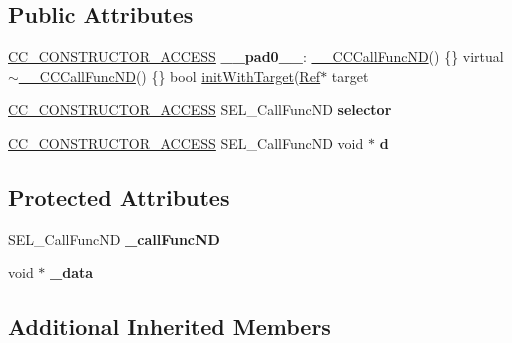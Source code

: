 \subsection*{Public Attributes}
\begin{DoxyCompactItemize}
\item 
\mbox{\label{class____CCCallFuncND_a8e47248aa40718ef17f10165dc3d3a32}} 
\hyperlink{_2cocos2d_2cocos_2base_2ccConfig_8h_a25ef1314f97c35a2ed3d029b0ead6da0}{C\+C\+\_\+\+C\+O\+N\+S\+T\+R\+U\+C\+T\+O\+R\+\_\+\+A\+C\+C\+E\+SS} {\bfseries \+\_\+\+\_\+pad0\+\_\+\+\_\+}\+: \hyperlink{class____CCCallFuncND}{\+\_\+\+\_\+\+C\+C\+Call\+Func\+ND}() \{\} virtual $\sim$\hyperlink{class____CCCallFuncND}{\+\_\+\+\_\+\+C\+C\+Call\+Func\+ND}() \{\} bool \hyperlink{classCallFunc_a68a7834d7931d5439faf49ca6e955dd7}{init\+With\+Target}(\hyperlink{classRef}{Ref}$\ast$ target
\item 
\mbox{\label{class____CCCallFuncND_aeb2b7369b7596436ea9c92668ae2d653}} 
\hyperlink{_2cocos2d_2cocos_2base_2ccConfig_8h_a25ef1314f97c35a2ed3d029b0ead6da0}{C\+C\+\_\+\+C\+O\+N\+S\+T\+R\+U\+C\+T\+O\+R\+\_\+\+A\+C\+C\+E\+SS} S\+E\+L\+\_\+\+Call\+Func\+ND {\bfseries selector}
\item 
\mbox{\label{class____CCCallFuncND_af8022787c42afb712edf7ad6d6111f33}} 
\hyperlink{_2cocos2d_2cocos_2base_2ccConfig_8h_a25ef1314f97c35a2ed3d029b0ead6da0}{C\+C\+\_\+\+C\+O\+N\+S\+T\+R\+U\+C\+T\+O\+R\+\_\+\+A\+C\+C\+E\+SS} S\+E\+L\+\_\+\+Call\+Func\+ND void $\ast$ {\bfseries d}
\end{DoxyCompactItemize}
\subsection*{Protected Attributes}
\begin{DoxyCompactItemize}
\item 
\mbox{\label{class____CCCallFuncND_a6d5e354b8374d079d8fe1d56a0fd8a06}} 
S\+E\+L\+\_\+\+Call\+Func\+ND {\bfseries \+\_\+call\+Func\+ND}
\item 
\mbox{\label{class____CCCallFuncND_a82ca053186a71178dbb78b5058809d18}} 
void $\ast$ {\bfseries \+\_\+data}
\end{DoxyCompactItemize}
\subsection*{Additional Inherited Members}


